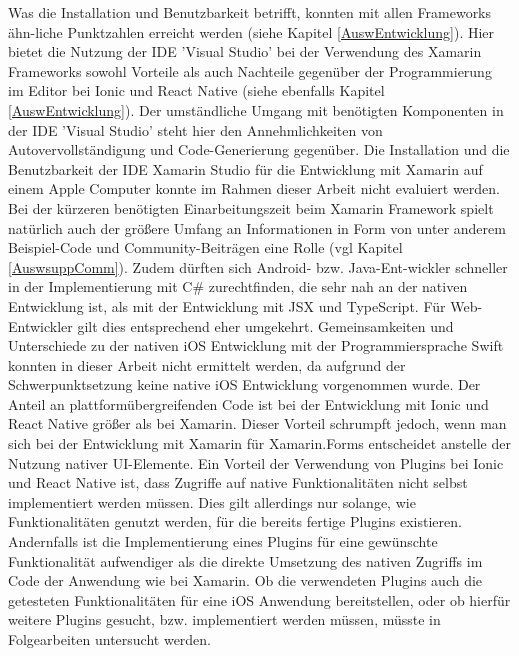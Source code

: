 Was die Installation und Benutzbarkeit betrifft, konnten mit allen Frameworks ähn-liche Punktzahlen erreicht werden (siehe Kapitel \ref{AuswEntwicklung}). Hier bietet die Nutzung der IDE 'Visual Studio' bei der Verwendung des Xamarin Frameworks sowohl Vorteile als auch Nachteile gegenüber der Programmierung im Editor bei Ionic und React Native (siehe ebenfalls Kapitel \ref{AuswEntwicklung}). Der umständliche Umgang mit benötigten Komponenten in der IDE 'Visual Studio' steht hier den Annehmlichkeiten von Autovervollständigung und Code-Generierung gegenüber. Die Installation und die Benutzbarkeit der IDE Xamarin Studio für die Entwicklung mit Xamarin auf einem Apple Computer konnte im Rahmen dieser Arbeit nicht evaluiert werden. Bei der kürzeren benötigten Einarbeitungszeit beim Xamarin Framework spielt natürlich auch der größere Umfang an Informationen in Form von unter anderem Beispiel-Code und Community-Beiträgen eine Rolle (vgl Kapitel \ref{AuswsuppComm}). Zudem dürften sich Android- bzw. Java-Ent-wickler schneller in der Implementierung mit C\# zurechtfinden, die sehr nah an der nativen Entwicklung ist, als mit der Entwicklung mit JSX und TypeScript. Für Web-Entwickler gilt dies entsprechend eher umgekehrt. Gemeinsamkeiten und Unterschiede zu der nativen iOS Entwicklung mit der Programmiersprache Swift konnten in dieser Arbeit nicht ermittelt werden, da aufgrund der Schwerpunktsetzung keine native iOS Entwicklung vorgenommen wurde. Der Anteil an plattformübergreifenden Code ist bei der Entwicklung mit Ionic und React Native größer als bei Xamarin. Dieser Vorteil schrumpft jedoch, wenn man sich bei der Entwicklung mit Xamarin für Xamarin.Forms entscheidet anstelle der Nutzung nativer UI-Elemente. Ein Vorteil der Verwendung von Plugins bei Ionic und React Native ist, dass Zugriffe auf native Funktionalitäten nicht selbst implementiert werden müssen. Dies gilt allerdings nur solange, wie Funktionalitäten genutzt werden, für die bereits fertige Plugins existieren. Andernfalls ist die Implementierung eines Plugins für eine gewünschte Funktionalität aufwendiger als die direkte Umsetzung des nativen Zugriffs im Code der Anwendung wie bei Xamarin. Ob die verwendeten Plugins auch die getesteten Funktionalitäten für eine iOS Anwendung bereitstellen, oder ob hierfür weitere Plugins gesucht, bzw. implementiert werden müssen, müsste in Folgearbeiten untersucht werden.
\\
\\
